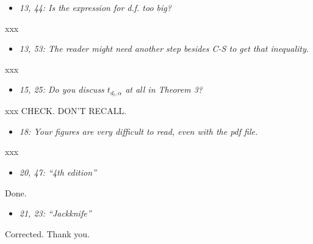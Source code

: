 \documentclass[11pt,notitlepage,onecolumn]{article}
\newcommand{\noi}{\noindent}
\begin{document}
\begin{itemize}
\item[] \textit{13, 44: Is the expression for d.f. too big?}
\end{itemize}

\noi
xxx  
\medskip 



\begin{itemize}
\item[] \textit{13, 53: The reader might need another step besides C-S to get that inequality.}
\end{itemize}

\noi
xxx  
\medskip 



\begin{itemize}
\item[] \textit{15, 25: Do you discuss $t_{d_l,\alpha}$ at all in Theorem 3?}
\end{itemize}

\noi
xxx  CHECK. DON'T RECALL.
\medskip 



\begin{itemize}
\item[] \textit{18: Your figures are very difficult to read, even with the pdf file.}
\end{itemize}

\noi
xxx  
\medskip 



\begin{itemize}
\item[] \textit{20, 47: ``4th edition''}
\end{itemize}

\noi
Done.
\medskip 



\begin{itemize}
\item[] \textit{21, 23: ``\it Jackknife''}
\end{itemize}

\noi
Corrected. Thank you. 
\end{document}
